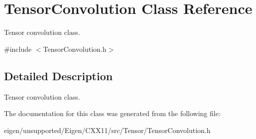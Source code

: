 \hypertarget{class_tensor_convolution}{}\section{Tensor\+Convolution Class Reference}
\label{class_tensor_convolution}


Tensor convolution class.  




{\ttfamily \#include $<$Tensor\+Convolution.\+h$>$}



\subsection{Detailed Description}
Tensor convolution class. 

The documentation for this class was generated from the following file\+:\begin{DoxyCompactItemize}
\item 
eigen/unsupported/\+Eigen/\+C\+X\+X11/src/\+Tensor/\+Tensor\+Convolution.\+h\end{DoxyCompactItemize}
